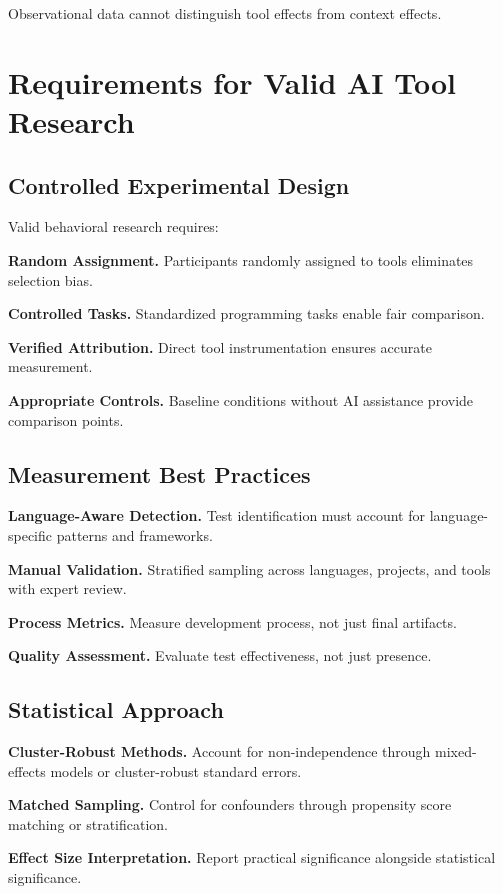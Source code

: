 \documentclass[conference]{IEEEtran}
\begin{document}
Observational data cannot distinguish tool effects from context effects.

\section{Requirements for Valid AI Tool Research}

\subsection{Controlled Experimental Design}
Valid behavioral research requires:

\textbf{Random Assignment.} Participants randomly assigned to tools eliminates selection bias.

\textbf{Controlled Tasks.} Standardized programming tasks enable fair comparison.

\textbf{Verified Attribution.} Direct tool instrumentation ensures accurate measurement.

\textbf{Appropriate Controls.} Baseline conditions without AI assistance provide comparison points.

\subsection{Measurement Best Practices}

\textbf{Language-Aware Detection.} Test identification must account for language-specific patterns and frameworks.

\textbf{Manual Validation.} Stratified sampling across languages, projects, and tools with expert review.

\textbf{Process Metrics.} Measure development process, not just final artifacts.

\textbf{Quality Assessment.} Evaluate test effectiveness, not just presence.

\subsection{Statistical Approach}
\textbf{Cluster-Robust Methods.} Account for non-independence through mixed-effects models or cluster-robust standard errors.

\textbf{Matched Sampling.} Control for confounders through propensity score matching or stratification.

\textbf{Effect Size Interpretation.} Report practical significance alongside statistical significance.
\end{document}
